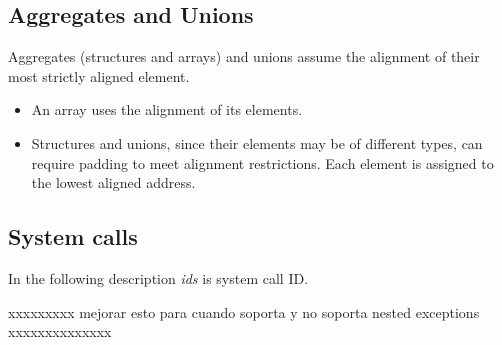 \subsection{Aggregates and Unions}
Aggregates (structures and arrays) and unions assume the alignment of their most strictly aligned element.
\begin{itemize}
\item An array uses the alignment of its elements.
\item Structures and unions, since their elements may be of different types, can require padding to meet alignment restrictions.
      Each element is assigned to the lowest aligned address.
\end{itemize}














\subsection{System calls}
\label{sec:system_calls}
In the following description \emph{ids} is system call ID.


xxxxxxxxx mejorar esto para cuando soporta y no soporta nested exceptions xxxxxxxxxxxxxx

